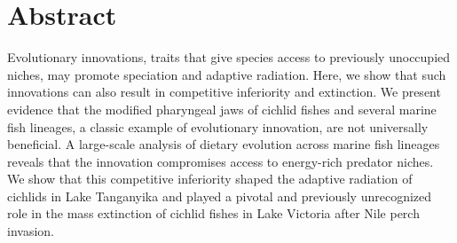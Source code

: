 \section{Abstract}

Evolutionary innovations, traits that give species access to previously unoccupied niches, may promote speciation and adaptive radiation. Here, we show that such innovations can also result in competitive inferiority and extinction. We present evidence that the modified pharyngeal jaws of cichlid fishes and several marine fish lineages, a classic example of evolutionary innovation, are not universally beneficial. A large-scale analysis of dietary evolution across marine fish lineages reveals that the innovation compromises access to energy-rich predator niches. We show that this competitive inferiority shaped the adaptive radiation of cichlids in Lake Tanganyika and played a pivotal and previously unrecognized role in the mass extinction of cichlid fishes in Lake Victoria after Nile perch invasion.